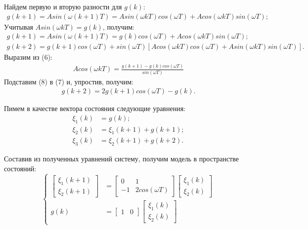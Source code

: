 \documentclass[a4paper,14pt]{extreport}
\begin{document}
Найдем первую и вторую разности для $g(k)$:
\begin{align}
	g(k+1) = A sin(\omega (k +1) T) = A sin(\omega k T) cos(\omega T) + A cos(\omega k T) sin(\omega T);
\end{align}
Учитывая $A sin(\omega k T) = g(k)$, получим:
\begin{align}
g(k+1) = A sin(\omega (k +1) T) = g(k) cos(\omega T) + A cos(\omega k T) sin(\omega T);\\
g(k+2) = g(k+1) cos(\omega T) + sin(\omega T) [A cos(\omega k T) cos(\omega T) + A sin(\omega k T ) sin(\omega T)].
\end{align}
Выразим из (6):
\begin{align}
	A cos(\omega k T) = \frac{g(k+1) - g(k) cos(\omega T)}{sin(\omega T)}
\end{align}
Подставим (8) в (7) и, упростив, получим:
\begin{align}
	g(k+2) = 2 g(k+1) cos(\omega T) -g(k).
\end{align}

Пимем в качестве вектора состояния следующие уравнения:
\begin{align}
\xi_1(k) &= g(k);\\
\xi_2(k) &= \xi_1(k+1) + g(k+1);\\
\xi_3(k) &= \xi_2(k+1) + g(k+2).
\end{align}

Составив из полученных уравнений систему, получим модель в пространстве состояний:
\begin{equation}
	\begin{cases}
	\begin{bmatrix}
	\xi_1(k+1) \\
	\xi_2(k+1)
	\end{bmatrix}
	&=\begin{bmatrix}
	0&1\\
	-1& 2 cos(\omega T)
	\end{bmatrix}
	\begin{bmatrix}
	\xi_1(k)\\
	\xi_2(k)
	\end{bmatrix}
	\\
	g(k) &= \begin{bmatrix}
	1& 0
	\end{bmatrix}
	\begin{bmatrix}
	\xi_1(k)\\
	\xi_2(k)
	\end{bmatrix}
	\end{cases}
\end{equation}
\end{document}

